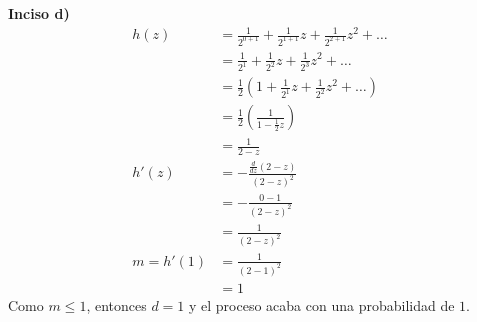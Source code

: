 \documentclass{article}
\begin{document}
\noindent \textbf{Inciso d)}
\begin{align}
    \nonumber
        h(z)        & = \frac{1}{2^{0+1}} + \frac{1}{2^{1+1}}z + \frac{1}{2^{2+1}}z^2 + \dots \\ \nonumber
                    & = \frac{1}{2^{1}} + \frac{1}{2^{2}}z + \frac{1}{2^{3}}z^2 + \dots \\ \nonumber
                    & = \frac{1}{2} \left(1 + \frac{1}{2^{1}}z + \frac{1}{2^{2}}z^2 + \dots \right)\\ \nonumber
                    & = \frac{1}{2} \left(\frac{1}{1-\frac{1}{2}z} \right)\\ \nonumber
                    & = \frac{1}{2-z} \\ \nonumber
        h'(z)       & = -\frac{\frac{d}{dz}(2-z)}{(2-z)^2} \\ \nonumber
                    & =-\frac{0-1}{(2-z)^2} \\ \nonumber
                    & =\frac{1}{(2-z)^2} \\ \nonumber
        m = h'(1)   & = \frac{1}{(2-1)^2}  \\ \nonumber
                    & = 1 \nonumber
\end{align}
Como $m \leq 1$, entonces $d=1$ y el proceso acaba con una probabilidad de $1$.
\end{document}
